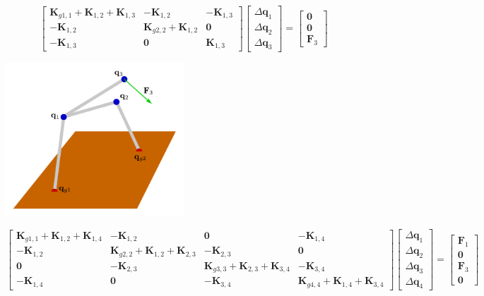 \documentclass{article}
\begin{document}
\[\begin{bmatrix} 
\mathbf{K}_{g1,1} + \mathbf{K}_{1,2} + \mathbf{K}_{1,3} & -\mathbf{K}_{1,2} & -\mathbf{K}_{1,3} \\ 
-\mathbf{K}_{1,2} & \mathbf{K}_{g2,2} + \mathbf{K}_{1,2} & \mathbf{0} \\  
-\mathbf{K}_{1,3} & \mathbf{0} & \mathbf{K}_{1,3}
\end{bmatrix}\begin{bmatrix} 
\Delta\mathbf{q}_1 \\ 
\Delta\mathbf{q}_2 \\ 
\Delta\mathbf{q}_3
\end{bmatrix} = \begin{bmatrix}
\mathbf{0} \\ 
\mathbf{0} \\ 
\mathbf{F}_3 
\end{bmatrix}\]

\begin{center}
\includegraphics[width = 0.5\textwidth]{elastic_mesh_example_4}
\end{center}




\[\begin{bmatrix} 
\mathbf{K}_{g1,1} + \mathbf{K}_{1,2} + \mathbf{K}_{1,4} & -\mathbf{K}_{1,2} & \mathbf{0} & -\mathbf{K}_{1,4} \\ 
-\mathbf{K}_{1,2} & \mathbf{K}_{g2,2} + \mathbf{K}_{1,2} + \mathbf{K}_{2,3} & -\mathbf{K}_{2,3} & \mathbf{0} \\
\mathbf{0} & -\mathbf{K}_{2,3} & \mathbf{K}_{g3,3} + \mathbf{K}_{2,3} + \mathbf{K}_{3,4} & -\mathbf{K}_{3,4} \\ 
-\mathbf{K}_{1,4} & \mathbf{0} & -\mathbf{K}_{3,4} & \mathbf{K}_{g4,4} + \mathbf{K}_{1,4} + \mathbf{K}_{3,4}
\end{bmatrix}\begin{bmatrix} 
\Delta\mathbf{q}_1 \\ 
\Delta\mathbf{q}_2 \\
\Delta\mathbf{q}_3 \\ 
\Delta\mathbf{q}_4
\end{bmatrix} = \begin{bmatrix}
\mathbf{F}_1 \\
\mathbf{0} \\ 
\mathbf{F}_3 \\ 
\mathbf{0} 
\end{bmatrix}\]
\end{document}
